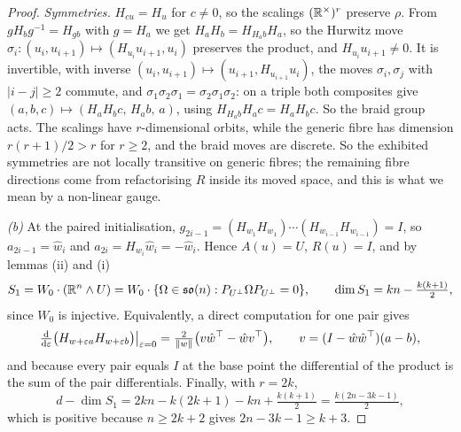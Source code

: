 \begin{proof}
\emph{Symmetries.} $H_{cu}=H_u$ for $c\ne0$, so the scalings $(\mathbb{R}^\times)^r$ preserve $\rho$. From $gH_bg^{-1}=H_{gb}$
with $g=H_a$ we get $H_aH_b=H_{H_ab}H_a$, so the Hurwitz move $\sigma_i:(u_i,u_{i+1})\mapsto(H_{u_i}u_{i+1},u_i)$ preserves the
product, and $H_{u_i}u_{i+1}\ne0$. It is invertible, with inverse $(u_i,u_{i+1})\mapsto(u_{i+1},H_{u_{i+1}}u_i)$, the moves
$\sigma_i,\sigma_j$ with $\lvert i-j\rvert\ge2$ commute, and $\sigma_1\sigma_2\sigma_1=\sigma_2\sigma_1\sigma_2$: on a triple
both composites give $(a,b,c)\mapsto(H_aH_bc,\,H_ab,\,a)$, using $H_{H_ab}H_ac=H_aH_bc$. So the braid group acts. The
scalings have $r$-dimensional orbits, while the generic fibre has dimension $r(r+1)/2>r$ for $r\ge2$, and the braid moves are
discrete. So the exhibited symmetries are not locally transitive on generic fibres; the remaining fibre directions come from
refactorising $R$ inside its moved space, and this is what we mean by a non-linear gauge.

\emph{(b)} At the paired initialisation, $g_{2i-1}=(H_{w_1}H_{w_1})\cdots(H_{w_{i-1}}H_{w_{i-1}})=I$, so $a_{2i-1}=\hat w_i$
and $a_{2i}=H_{w_i}\hat w_i=-\hat w_i$. Hence $A(u)=U$, $R(u)=I$, and by lemmas (ii) and (i)
\begin{equation*}
  S_1=W_0\cdot(\mathbb{R}^n\wedge U)=W_0\cdot\{\Omega\in\mathfrak{so}(n):P_{U^\perp}\Omega P_{U^\perp}=0\},\qquad\dim S_1=kn-\tfrac{k(k+1)}2,
\end{equation*}
since $W_0$ is injective. Equivalently, a direct computation for one pair gives
\begin{equation*}
  \tfrac{\mathrm{d}}{\mathrm{d}\varepsilon}\big(H_{w+\varepsilon a}H_{w+\varepsilon b}\big)\big|_{\varepsilon=0}
  =\tfrac2{\lVert w\rVert}\big(v\hat w^{\top}-\hat wv^{\top}\big),\qquad v=(I-\hat w\hat w^{\top})(a-b),
\end{equation*}
and because every pair equals $I$ at the base point the differential of the product is the
sum of the pair differentials. Finally, with $r=2k$,
\begin{equation*}
  d-\dim S_1=2kn-k(2k+1)-kn+\tfrac{k(k+1)}2=\tfrac{k(2n-3k-1)}2 ,
\end{equation*}
which is positive because $n\ge2k+2$ gives $2n-3k-1\ge k+3$.


\end{proof}
